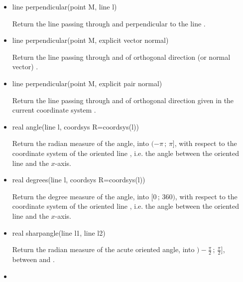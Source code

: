 \documentclass[pdftex]{article}
\begin{document}
\begin{itemize}
\item {}%
  \begin{Vcolor}
    line perpendicular(point M, line l)
  \end{Vcolor}
  Return the line passing through  and perpendicular to the
  line .
\item {}%
  \begin{Vcolor}
    line perpendicular(point M, explicit vector normal)
  \end{Vcolor}
  Return the line passing through  and of orthogonal
  direction (or normal vector) .
\item {}%
  \begin{Vcolor}
    line perpendicular(point M, explicit pair normal)
  \end{Vcolor}
  Return the line passing through  and of orthogonal
  direction  given in the current coordinate system .
\item {}%
  \begin{Vcolor}
    real angle(line l, coordsys R=coordsys(l))
  \end{Vcolor}
  Return the radian measure of the angle, into  $(-\pi\,;\,\pi]$, with
  respect to the coordinate system  of the oriented
  line , i.e. the angle between the oriented line and the $x$-axis.
\item {}%
  \begin{Vcolor}
    real degrees(line l, coordsys R=coordsys(l))
  \end{Vcolor}
  Return the degree measure of the angle, into $[0\,;\,360)$, with
  respect to the  coordinate system  of the oriented
  line , i.e.  the angle between the oriented line and the $x$-axis.
\item {}%
  \begin{Vcolor}
    real sharpangle(line l1, line l2)
  \end{Vcolor}
  Return the radian measure of the acute oriented angle, into
  $)-\frac{\pi}{2}\,;\,\frac{\pi}{2}]$, between  and .
\item {}%

\end{itemize}
\end{document}

